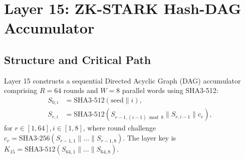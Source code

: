 \documentclass{ieeeaccess}
\begin{document}
\section{Layer 15: ZK-STARK Hash-DAG Accumulator}
\label{sec:L15}

\subsection{Structure and Critical Path}
Layer 15 constructs a sequential Directed Acyclic Graph (DAG) accumulator comprising $R = 64$ rounds and $W = 8$ parallel words using SHA3-512:
\begin{equation}
\begin{aligned}
  S_{0,i} &= \mathrm{SHA3\text{-}512}(\mathrm{seed} \parallel i), \\
  S_{r,i} &= \mathrm{SHA3\text{-}512}(S_{r-1, (i-1) \bmod 8} \parallel S_{r,i-1} \parallel c_r),
\end{aligned}
\label{eq:stark-dag}
\end{equation}
for $r \in [1, 64], i \in [1, 8]$, where round challenge $c_r = \mathrm{SHA3\text{-}256}(S_{r-1, 1} \parallel \dots \parallel S_{r-1, 8})$.
The layer key is $K_{15} = \mathrm{SHA3\text{-}512}(S_{64, 1} \parallel \dots \parallel S_{64, 8})$.
\end{document}

